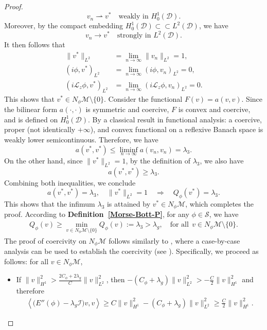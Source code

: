 \documentclass[preprint,3p]{elsarticle}
\begin{document}
\begin{proof}
	$$
	v_n \rightharpoonup v^* \quad \text{weakly in } H_0^1(\mathcal{D}).
	$$
	Moreover, by the compact embedding $H_0^1(\mathcal{D}) \subset\subset L^2(\mathcal{D})$, we have
	$$
	v_n \to v^* \quad \text{strongly in } L^2(\mathcal{D}).
	$$
	It then follows that
	\begin{align*}
		\|v^*\|_{L^2} &= \lim_{n \to \infty} \|v_n\|_{L^2} = 1, \\
		(i\phi, v^*)_{L^2} &= \lim_{n\to \infty} (i\phi, v_n)_{L^2} = 0, \\
		(i\mathcal{L}_z\phi, v^*)_{L^2} &= \lim_{n\to \infty} (i\mathcal{L}_z\phi, v_n)_{L^2} = 0.
	\end{align*}
	This shows that $v^* \in N_{\phi}\mathcal{M} \setminus \{0\}$. Consider the functional $F(v) = a(v,v)$. Since the bilinear form $a(\cdot,\cdot)$ is symmetric and coercive, $F$ is convex and coercive, and is defined on $H_0^1(\mathcal{D})$. By a classical result in functional analysis:  
	a coercive, proper (not identically $+\infty$), and convex functional on a reflexive Banach space is weakly lower semicontinuous.  
	Therefore, we have
	$$
	a(v^*, v^*) \leq \liminf_{n \to \infty} a(v_n, v_n) = \lambda_3.
	$$
	On the other hand, since $\|v^*\|_{L^2} = 1$, by the definition of $\lambda_3$, we also have
	$$
	a(v^*, v^*) \geq \lambda_3.
	$$
	Combining both inequalities, we conclude
	$$
	a(v^*, v^*) = \lambda_3, \quad \|v^*\|_{L^2} = 1 \quad \Rightarrow \quad Q_{\phi}(v^*) = \lambda_3.
	$$
	This shows that the infimum $\lambda_3$ is attained by $v^* \in N_{\phi}\mathcal{M}$, which completes the proof. According to {\bf Definition~\ref{Morse-Bott-P}}, for any $\phi \in \mathcal{S}$, we have
	\begin{align}\label{lambda1}
		Q_{\phi}(v) \ge {\min_{v \in N_{\phi}\mathcal{M}\setminus \{0\}}} Q_{\phi}(v) := \lambda_3 > \lambda_g, \quad {\text{for all}}\;\, v \in N_{\phi}\mathcal{M} \setminus \{0\}.
	\end{align}
	The proof of coercivity on $N_{\phi}\mathcal{M}$ follows similarly to \cite{2024Convergence}, where a case-by-case analysis can be used to establish the coercivity (see \cite[{\bf Lemma 2.3}]{2024Convergence}). Specifically, we proceed as follows: for all $v\in N_{\phi}\mathcal{M}$,
	\begin{itemize}
		\item If $\|v\|^2_{H^1}>\frac{2C_{\phi}+2\lambda_g}{C}\|v\|^2_{L^2}$, then $-\left(C_{\phi}+\lambda_g\right)\|v\|^2_{L^2}>-\frac{C}{2}\|v\|^2_{H^1}$ and therefore
		\begin{align*}
			\left\langle \big(E''(\phi) - \lambda_g \mathcal{I}\big)v, v \right\rangle\ge C\|v\|^2_{H^1}-\left(C_{\phi}+\lambda_g\right)\|v\|^2_{L^2}\ge\frac{C}{2}\|v\|^2_{H^1}.

\end{align*}
\end{itemize}
\end{proof}
\end{document}

